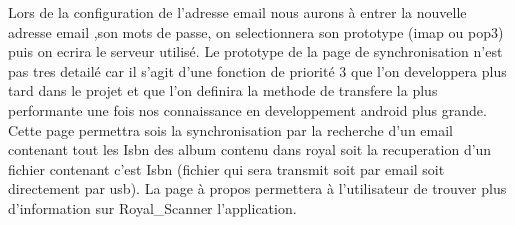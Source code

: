 Lors de la configuration de l'adresse email nous aurons à entrer la nouvelle adresse email ,son mots de passe, on selectionnera son prototype (imap ou pop3) puis on ecrira le serveur utilisé.
Le prototype de la page de synchronisation n'est pas tres detailé car il s'agit d'une fonction de priorité 3 que l'on developpera plus tard dans le projet et que l'on definira la methode de transfere la plus performante une fois nos connaissance en developpement android plus grande. 
Cette page permettra sois la synchronisation par la recherche d'un email contenant tout les Isbn des album contenu dans royal soit la recuperation d'un fichier contenant c'est Isbn (fichier qui sera transmit soit par email soit directement par usb).
La page à propos permettera à l'utilisateur de trouver plus d'information sur Royal\_Scanner l'application.